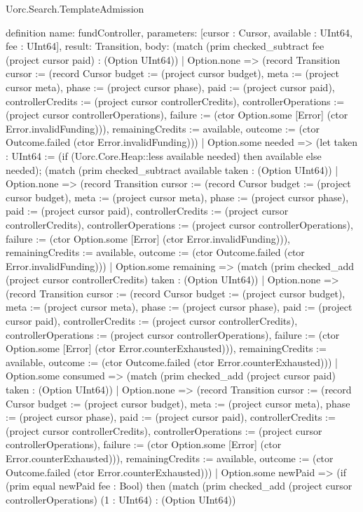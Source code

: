 \begin{lexlean}{Uorc.Search.TemplateAdmission}
\begin{semanticmodule}
definition{
  name: fundController,
  parameters: [cursor : Cursor, available : UInt64, fee : UInt64],
  result: Transition,
  body: (match (prim checked_subtract fee (project cursor paid) : (Option UInt64))
    | Option.none => (record Transition {cursor := (record Cursor {budget := (project cursor budget), meta := (project cursor meta), phase := (project cursor phase), paid := (project cursor paid), controllerCredits := (project cursor controllerCredits), controllerOperations := (project cursor controllerOperations), failure := (ctor Option.some [Error] (ctor Error.invalidFunding))}), remainingCredits := available, outcome := (ctor Outcome.failed (ctor Error.invalidFunding))})
    | Option.some needed => (let taken : UInt64 := (if (Uorc.Core.Heap::less available needed) then available else needed); (match (prim checked_subtract available taken : (Option UInt64))
      | Option.none => (record Transition {cursor := (record Cursor {budget := (project cursor budget), meta := (project cursor meta), phase := (project cursor phase), paid := (project cursor paid), controllerCredits := (project cursor controllerCredits), controllerOperations := (project cursor controllerOperations), failure := (ctor Option.some [Error] (ctor Error.invalidFunding))}), remainingCredits := available, outcome := (ctor Outcome.failed (ctor Error.invalidFunding))})
      | Option.some remaining => (match (prim checked_add (project cursor controllerCredits) taken : (Option UInt64))
        | Option.none => (record Transition {cursor := (record Cursor {budget := (project cursor budget), meta := (project cursor meta), phase := (project cursor phase), paid := (project cursor paid), controllerCredits := (project cursor controllerCredits), controllerOperations := (project cursor controllerOperations), failure := (ctor Option.some [Error] (ctor Error.counterExhausted))}), remainingCredits := available, outcome := (ctor Outcome.failed (ctor Error.counterExhausted))})
        | Option.some consumed => (match (prim checked_add (project cursor paid) taken : (Option UInt64))
          | Option.none => (record Transition {cursor := (record Cursor {budget := (project cursor budget), meta := (project cursor meta), phase := (project cursor phase), paid := (project cursor paid), controllerCredits := (project cursor controllerCredits), controllerOperations := (project cursor controllerOperations), failure := (ctor Option.some [Error] (ctor Error.counterExhausted))}), remainingCredits := available, outcome := (ctor Outcome.failed (ctor Error.counterExhausted))})
          | Option.some newPaid => (if (prim equal newPaid fee : Bool) then (match (prim checked_add (project cursor controllerOperations) (1 : UInt64) : (Option UInt64))
}
\end{semanticmodule}
\end{lexlean}
